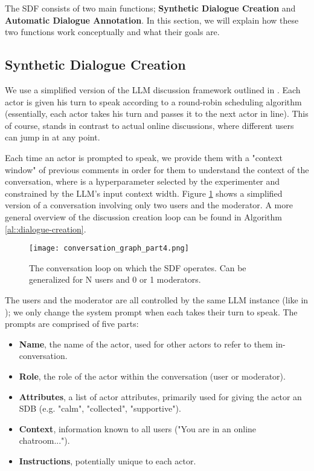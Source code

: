 The \ac{SDF} consists of two main functions; \textbf{Synthetic Dialogue Creation} and \textbf{Automatic Dialogue Annotation}. In this section, we will explain how these two functions work conceptually and what their goals are.


\subsection{Synthetic Dialogue Creation}
\label{ssec:system:creation}

We use a simplified version of the LLM discussion framework outlined in \citet{abdelnabi2024cooperationcompetitionmaliciousnessllmstakeholders}. Each actor is given his turn to speak according to a round-robin scheduling algorithm (essentially, each actor takes his turn and passes it to the next actor in line). This of course, stands in contrast to actual online discussions, where different users can jump in at any point.

Each time an actor is prompted to speak, we provide them with a "context window" of  previous comments in order for them to understand the context of the conversation, where  is a hyperparameter selected by the experimenter and constrained by the LLM's input context width. Figure \ref{fig::conversation} shows a simplified version of a conversation involving only two users and the moderator. A more general overview of the discussion creation loop can be found in Algorithm \ref{al::dialogue-creation}.


\begin{figure}
	\centering
	\texttt{[image: conversation\_graph\_part4.png]}
	\caption{The conversation loop on which the \ac{SDF} operates. Can be generalized for N users and 0 or 1 moderators.}
	\label{fig::conversation}
\end{figure}

The users and the moderator are all controlled by the same LLM instance (like in \citet{park2022socialsimulacracreatingpopulated}); we only change the system prompt when each takes their turn to speak. The prompts are comprised of five parts:

\begin{itemize}
	\item \textbf{Name}, the name of the actor, used for other actors to refer to them in-conversation.
	\item \textbf{Role}, the role of the actor within the conversation (user or moderator).
	\item \textbf{Attributes}, a list of actor attributes, primarily used for giving the actor an \ac{SDB} (e.g. "calm", "collected", "supportive").
	\item \textbf{Context}, information known to all users ("You are in an online chatroom...").
	\item \textbf{Instructions}, potentially unique to each actor. 
\end{itemize}



